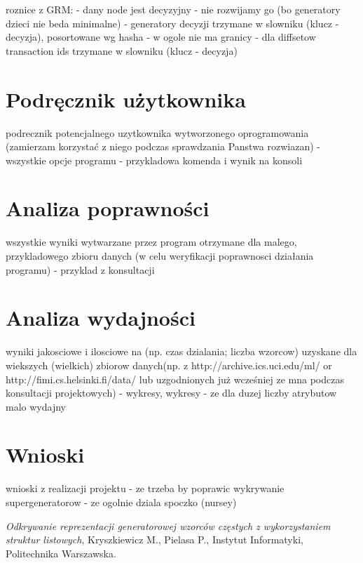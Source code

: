 \documentclass[a4paper,10pt]{article}
\begin{document}
roznice z GRM:
- dany node jest decyzyjny - nie rozwijamy go (bo generatory dzieci nie beda minimalne)
- generatory decyzji trzymane w slowniku (klucz - decyzja), posortowane wg hasha
- w ogole nie ma granicy
- dla diffsetow transaction ids trzymane w slowniku (klucz - decyzja)



\section{Podręcznik użytkownika}
podrecznik potencjalnego uzytkownika wytworzonego oprogramowania
(zamierzam korzystać z niego podczas sprawdzania Panstwa rozwiazan)
- wszystkie opcje programu
- przykladowa komenda i wynik na konsoli



\section{Analiza poprawności}
wszystkie wyniki wytwarzane przez program otrzymane dla malego,
przykladowego zbioru danych (w celu weryfikacji poprawnosci działania
programu)
- przyklad z konsultacji



\section{Analiza wydajności}
wyniki jakosciowe i ilosciowe na (np. czas dzialania; liczba wzorcow)
uzyskane dla wiekszych (wielkich) zbiorow danych(np. z
http://archive.ics.uci.edu/ml/ or http://fimi.cs.helsinki.fi/data/ lub
uzgodnionych już wcześniej ze mna podczas konsultacji projektowych)
- wykresy, wykresy
- ze dla duzej liczby atrybutow malo wydajny



\section{Wnioski}
wnioski z realizacji projektu
- ze trzeba by poprawic wykrywanie supergeneratorow
- ze ogolnie dziala spoczko (nursey)



\begin{thebibliography}{*}

  \emph{Odkrywanie reprezentacji generatorowej wzorców częstych z wykorzystaniem struktur listowych},
  Kryszkiewicz M., Pielasa P.,
  Instytut Informatyki,
  Politechnika Warszawska.


\end{thebibliography}
\end{document}

